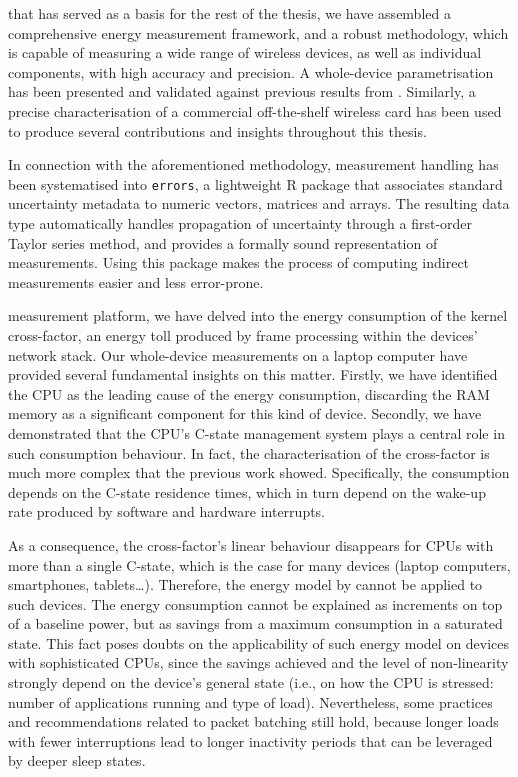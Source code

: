 \documentclass[twoside,nohyper]{tufte-book}
\theoremstyle{definition}
\theoremstyle{definition}
\theoremstyle{definition}
\theoremstyle{remark}
\begin{document}
 that has served as a
basis for the rest of the thesis, we have assembled a comprehensive
energy measurement framework, and a robust methodology, which is capable
of measuring a wide range of wireless devices, as well as individual
components, with high accuracy and precision. A whole-device
parametrisation has been presented and validated against previous
results from \citet{Serrano2014}. Similarly, a precise characterisation
of a commercial off-the-shelf wireless card has been used to produce
several contributions and insights throughout this thesis.

In connection with the aforementioned methodology, measurement handling
has been systematised into
\texttt{errors}\cite[0pt]{contrib-03},
a lightweight R package that associates standard uncertainty metadata to
numeric vectors, matrices and arrays. The resulting data type
automatically handles propagation of uncertainty through a first-order
Taylor series method, and provides a formally sound representation of
measurements. Using this package makes the process of computing indirect
measurements easier and less error-prone.

 measurement platform, we have delved into
the energy consumption of the kernel cross-factor, an energy toll
produced by frame processing within the devices' network stack. Our
whole-device measurements on a laptop computer have provided several
fundamental
insights\cite[-.9in]{contrib-04a,contrib-04b}
on this matter. Firstly, we have identified the CPU as the leading cause
of the energy consumption, discarding the RAM memory as a significant
component for this kind of device. Secondly, we have demonstrated that
the CPU's C-state management system plays a central role in such
consumption behaviour. In fact, the characterisation of the cross-factor
is much more complex that the previous work showed. Specifically, the
consumption depends on the C-state residence times, which in turn depend
on the wake-up rate produced by software and hardware interrupts.

As a consequence, the cross-factor's linear behaviour disappears for
CPUs with more than a single C-state, which is the case for many devices
(laptop computers, smartphones, tablets\ldots{}). Therefore, the energy
model by \citet{Serrano2014} cannot be applied to such devices. The
energy consumption cannot be explained as increments on top of a
baseline power, but as savings from a maximum consumption in a saturated
state. This fact poses doubts on the applicability of such energy model
on devices with sophisticated CPUs, since the savings achieved and the
level of non-linearity strongly depend on the device's general state
(i.e., on how the CPU is stressed: number of applications running and
type of load). Nevertheless, some practices and recommendations related
to packet batching still hold, because longer loads with fewer
interruptions lead to longer inactivity periods that can be leveraged by
deeper sleep states.
\end{document}
